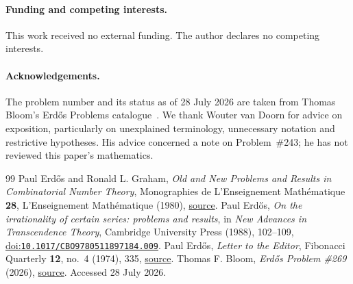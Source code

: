 \documentclass[11pt]{article}
\begin{document}
\paragraph{Funding and competing interests.}
This work received no external funding. The author declares no competing
interests.
\paragraph{Acknowledgements.}
The problem number and its status as of 28 July 2026 are taken from Thomas
Bloom's Erd\H{o}s Problems catalogue~\cite{erdosproblems}. We thank Wouter
van Doorn for advice on exposition, particularly on unexplained terminology,
unnecessary notation and restrictive hypotheses. His advice concerned a
note on Problem~\#243; he has not reviewed this paper's mathematics.

\begin{thebibliography}{99}
\setlength{\itemsep}{3pt plus .5pt minus .5pt}
\setlength{\parsep}{0pt}\setlength{\parskip}{0pt}
 Paul Erd\H{o}s and Ronald L. Graham,
  \emph{Old and New Problems and Results in Combinatorial Number Theory}, Monographies de L'Enseignement Math\'{e}matique \textbf{28}, L'Enseignement Math\'{e}matique (1980),
  \href{https://mathweb.ucsd.edu/~ronspubs/80_11_number_theory.pdf}{source}.
 Paul Erd\H{o}s,
  \emph{On the irrationality of certain series: problems and results}, in \emph{New Advances in Transcendence Theory}, Cambridge University Press (1988), 102--109,
  \href{https://doi.org/10.1017/CBO9780511897184.009}{doi:\nolinkurl{10.1017/CBO9780511897184.009}}.
 Paul Erd\H{o}s,
  \emph{Letter to the Editor}, Fibonacci Quarterly \textbf{12}, no.~4 (1974), 335,
  \href{https://www.fq.math.ca/Scanned/12-4/letter.pdf}{source}.
 Thomas F. Bloom,
  \emph{Erd\H{o}s Problem \#269} (2026),
  \href{https://www.erdosproblems.com/269}{source}. Accessed 28 July 2026.
\end{thebibliography}
\end{document}
